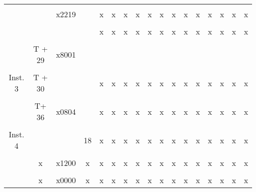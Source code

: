 \documentclass{patt}
\begin{document}
\begin{exercises}
\begin{tabular}{|c|c|c|c|@{}c@{}|@{}c@{}|@{}c@{}|@{}c@{}|@{}c@{}|@{}c@{}|@{}c@{}|@{}c@{}|@{}c@{}|p{0.9cm}|@{}c@{}|c|p{1cm}|}
\cline{2-17}
 & & & & & & & & & & & & & & & & \\
&  & x2219 &  & x & x & x & x & x & x & x & x & x & x & x & x & x \\
\cline{2-17}
 & & & & & & & & & & & & & & & & \\
&  &  &  & x & x & x & x & x & x & x & x & x & x & x & x & x \\
\cline{2-17}
 & & & & & & & & & & & & & & & & \\
& T + 29 & x8001  &  &  &  &  &  &  &  &  &  &  &  &  &  &  \\
\hline
 & & & & & & & & & & & & & & & & \\
Inst. 3 & T + 30 &  &  & x & x & x & x & x & x & x & x & x & x & x & x & x \\
\cline{2-17}
 & & & & & & & & & & & & & & & & \\
& T+ 36 & x0804  &  & x & x & x & x & x & x & x & x & x & x & x & x & x \\
\hline
 & & & & & & & & & & & & & & & & \\
Inst. 4 &  &  & 18  & x & x & x & x & x & x & x & x & x & x & x & x & x \\
\cline{2-17}
 & & & & & & & & & & & & & & & & \\
& x  & x1200  & x  & x & x & x & x & x & x & x & x & x & x & x & x & x \\
\cline{2-17}
 & & & & & & & & & & & & & & & & \\
& x  & x0000  & x  & x & x & x & x & x & x & x & x & x & x & x & x & x \\
\hline
\end{tabular}


\end{exercises}
\end{document}
